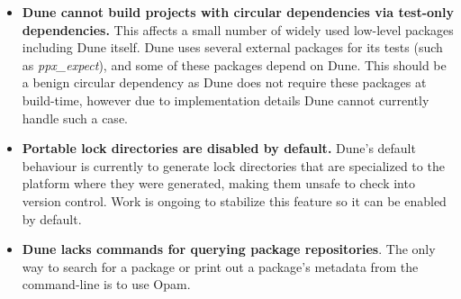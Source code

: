 \documentclass{article}
\begin{document}
\begin{multicols}{2}
        \begin{itemize}
            \item \textbf{Dune cannot build projects with circular dependencies
                via test-only dependencies.} This affects a small number of
                widely used low-level packages including Dune itself. Dune uses
                several external packages for its tests (such as
                \textit{ppx\_expect}), and some of these packages depend on
                Dune. This should be a benign circular dependency as Dune does
                not require these packages at build-time, however due to
                implementation details Dune cannot currently handle such a case.
            \item \textbf{Portable lock directories are disabled by default.}
                Dune's default behaviour is currently to generate lock
                directories that are specialized to the platform where they were
                generated, making them unsafe to check into version control.
                Work is ongoing to stabilize this feature so it can be enabled
                by default.
            \item \textbf{Dune lacks commands for querying package
                repositories}. The only way to search for a package or print out
                a package's metadata from the command-line is to use Opam.
        \end{itemize}

    \end{multicols}
\end{document}
